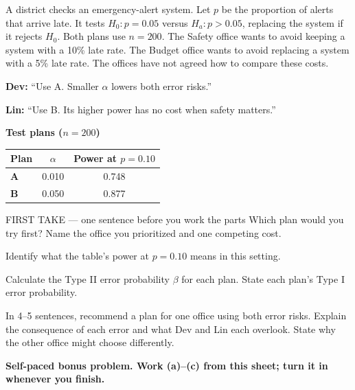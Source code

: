 \documentclass[14pt]{extarticle}
\begin{document}
\pagestyle{empty}


\noindent\begin{minipage}[t]{0.57\linewidth}
\vspace{0pt}
A district checks an emergency-alert system. Let $p$ be the proportion of alerts that arrive late. It tests $H_0:p=0.05$ versus $H_a:p>0.05$, replacing the system if it rejects $H_0$. Both plans use $n=200$. The Safety office wants to avoid keeping a system with a 10\% late rate. The Budget office wants to avoid replacing a system with a 5\% late rate. The offices have not agreed how to compare these costs.\par\smallskip \textbf{Dev:} ``Use A. Smaller $\alpha$ lowers both error risks.''\par \textbf{Lin:} ``Use B. Its higher power has no cost when safety matters.''\par
\end{minipage}\hfill
\begin{minipage}[t]{0.40\linewidth}
\vspace{0pt}
\begin{center}
\textbf{Test plans ($n=200$)}\par\smallskip
\begin{tabular}{|l|c|c|}
\hline
\textbf{Plan} & \textbf{$\alpha$} & \textbf{Power at $p=0.10$} \\ \hline
\textbf{A} & 0.010 & 0.748 \\ \hline
\textbf{B} & 0.050 & 0.877 \\ \hline
\end{tabular}
\end{center}
\end{minipage}

\begin{firsttakebox}{FIRST TAKE --- one sentence before you work the parts}
Which plan would you try first? Name the office you prioritized and one competing cost.
\end{firsttakebox}

\begin{description}[leftmargin=1.15in, labelwidth=1in, itemsep=2pt, topsep=2pt]
  \item[\dokbadge{1}~(a)] Identify what the table's power at $p=0.10$ means in this setting.
  \item[\dokbadge{2}~(b)] Calculate the Type II error probability $\beta$ for each plan. State each plan's Type I error probability.
  \item[\dokbadge{3}~(c)] In 4--5 sentences, recommend a plan for one office using both error risks. Explain the consequence of each error and what Dev and Lin each overlook. State why the other office might choose differently.
\end{description}

\vfill
\textbf{Self-paced bonus problem. Work (a)--(c) from this sheet; turn it in whenever you finish.}
\end{document}
